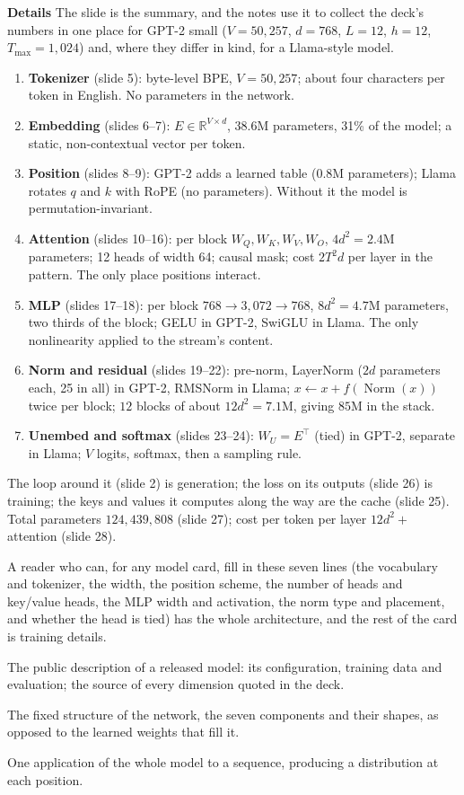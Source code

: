 \documentclass[11pt,letterpaper]{article}
\newcommand{\para}[1]{\medskip\noindent\textbf{#1}\quad}
\newenvironment{terms}{\begin{tcolorbox}[termsbox]\begin{description}[leftmargin=1.1em,itemsep=3pt,topsep=2pt,font=\normalfont]}{\end{description}\end{tcolorbox}}
\newcommand{\term}[2]{\item[\textbf{#1}]\index{#1} #2}
\newcommand{\Tmax}{T_{\max}}
\DeclareMathOperator{\Norm}{Norm}
\begin{document}
\para{Details} The slide is the summary, and the notes use it to collect the deck's numbers in one place for GPT-2 small ($V=50{,}257$, $d=768$, $L=12$, $h=12$, $\Tmax=1{,}024$) and, where they differ in kind, for a Llama-style model.
\begin{enumerate}
\item \textbf{Tokenizer} (slide 5): byte-level BPE, $V=50{,}257$; about four characters per token in English. No parameters in the network.
\item \textbf{Embedding} (slides 6--7): $E\in\mathbb{R}^{V\times d}$, $38.6$M parameters, 31\% of the model; a static, non-contextual vector per token.
\item \textbf{Position} (slides 8--9): GPT-2 adds a learned table ($0.8$M parameters); Llama rotates $q$ and $k$ with RoPE (no parameters). Without it the model is permutation-invariant.
\item \textbf{Attention} (slides 10--16): per block $W_Q,W_K,W_V,W_O$, $4d^2=2.4$M parameters; 12 heads of width 64; causal mask; cost $2T^2d$ per layer in the pattern. The only place positions interact.
\item \textbf{MLP} (slides 17--18): per block $768\to3{,}072\to768$, $8d^2=4.7$M parameters, two thirds of the block; GELU in GPT-2, SwiGLU in Llama. The only nonlinearity applied to the stream's content.
\item \textbf{Norm and residual} (slides 19--22): pre-norm, LayerNorm ($2d$ parameters each, 25 in all) in GPT-2, RMSNorm in Llama; $x\leftarrow x+f(\Norm(x))$ twice per block; $12$ blocks of about $12d^2=7.1$M, giving $85$M in the stack.
\item \textbf{Unembed and softmax} (slides 23--24): $W_U=E^{\top}$ (tied) in GPT-2, separate in Llama; $V$ logits, softmax, then a sampling rule.
\end{enumerate}
The loop around it (slide 2) is generation; the loss on its outputs (slide 26) is training; the keys and values it computes along the way are the cache (slide 25). Total parameters $124{,}439{,}808$ (slide 27); cost per token per layer $12d^2+$ attention (slide 28).

A reader who can, for any model card, fill in these seven lines (the vocabulary and tokenizer, the width, the position scheme, the number of heads and key/value heads, the MLP width and activation, the norm type and placement, and whether the head is tied) has the whole architecture, and the rest of the card is training details.

\begin{terms}
\term{model card}{The public description of a released model: its configuration, training data and evaluation; the source of every dimension quoted in the deck.}
\term{architecture}{The fixed structure of the network, the seven components and their shapes, as opposed to the learned weights that fill it.}
\term{forward pass}{One application of the whole model to a sequence, producing a distribution at each position.}
\end{terms}
\end{document}
